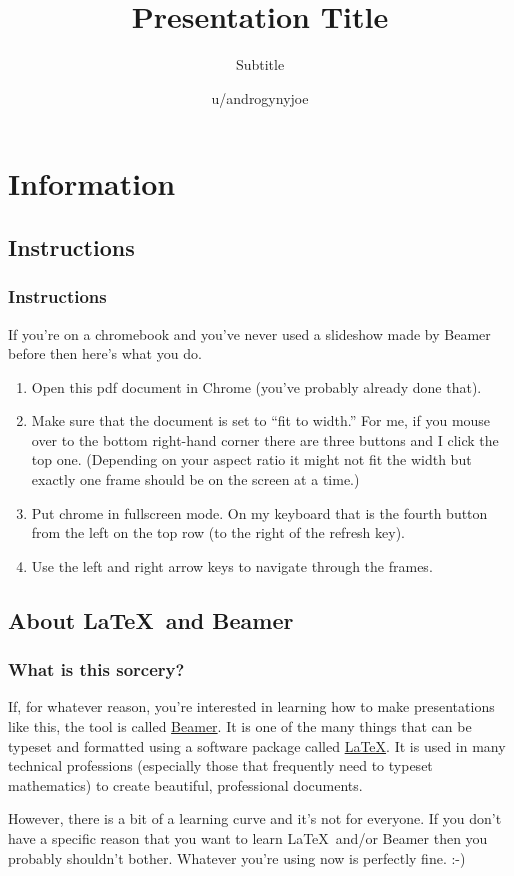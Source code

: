 \documentclass{beamer}
\title{Presentation Title}
\subtitle{Subtitle}
\author{u/androgynyjoe}
\institute{Reddit}
\begin{document}
\frame{\titlepage}

\section{Information}
\subsection{Instructions}

\begin{frame}
\frametitle{Instructions}

If you're on a chromebook and you've never used a slideshow made by Beamer before then here's what you do.
\begin{enumerate}
\item Open this pdf document in Chrome (you've probably already done that).
\item Make sure that the document is set to ``fit to width.''  For me, if you mouse over to the bottom right-hand corner there are three buttons and I click the top one.  (Depending on your aspect ratio it might not fit the width but exactly one frame should be on the screen at a time.)
\item Put chrome in fullscreen mode.  On my keyboard that is the fourth button from the left on the top row (to the right of the refresh key).
\item Use the left and right arrow keys to navigate through the frames.
\end{enumerate}
\end{frame}

\subsection{About \LaTeX\ and Beamer}

\begin{frame}
\frametitle{What is this sorcery?}
If, for whatever reason, you're interested in learning how to make presentations like this, the tool is called \href{https://www.overleaf.com/learn/latex/Beamer}{Beamer}.  It is one of the many things that can be typeset and formatted using a software package called \href{https://www.latex-project.org/about/}{\LaTeX}.  It is used in many technical professions (especially those that frequently need to typeset mathematics) to create beautiful, professional documents.

\bigskip

However, there is a bit of a learning curve and it's not for everyone.  If you don't have a specific reason that you want to learn \LaTeX\ and/or Beamer then you probably shouldn't bother.  Whatever you're using now is perfectly fine.  :-)
\end{frame}
\end{document}
